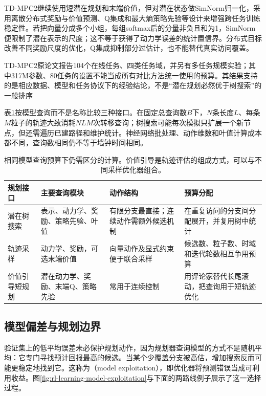 TD-MPC2继续使用短潜在规划和末端价值，但对潜在状态做SimNorm归一化，采用离散分布式奖励与价值预测、Q集成和最大熵策略先验等设计来增强跨任务训练稳定性。若把向量分成多个小组，每组softmax后的分量非负且和为1，SimNorm便限制了潜在表示的尺度；这不等于获得了动力学误差的统计置信界。分布式目标改善不同奖励尺度的优化，Q集成抑制部分过估计，也不能替代真实访问覆盖。

TD-MPC2原论文报告104个在线任务、四类任务域，并另有多任务规模实验；其中317M参数、80任务的设置不能当成所有对比方法统一使用的预算。其结果支持的是相应数据、模型和任务协议下的经验结论，不是“潜在规划必然优于树搜索”的一般排序

表\ref{tab:rl-learning-planning-budgets}按模型查询而不是名称比较三种接口。在固定总查询数$B$下，$N$条长度$L$、每条$M$粒子的轨迹大致消耗$NLM$次转移查询；树搜索可能每次模拟只扩展一个新节点，但还需遍历已建路径和维护统计。神经网络批处理、动作维数和叶值计算成本都不同，查询数相同仍不等于墙钟时间相同。

\begin{table}[t]
  \centering
  \small
  \begin{tabularx}{\linewidth}{>{\raggedright\arraybackslash}p{23mm} >{\raggedright\arraybackslash}X >{\raggedright\arraybackslash}X >{\raggedright\arraybackslash}X}
    \toprule
    规划接口 & 主要查询模块 & 动作结构 & 预算分配 \\
    \midrule
    潜在树搜索 & 表示、动力学、奖励、策略先验、叶值 & 有限分支最直接；连续动作需额外候选机制 & 在重复访问的分支间分配展开，并复用树中统计 \\
    轨迹采样 & 动力学、奖励，可选末端价值 & 向量动作及显式约束便于联合采样 & 候选数、粒子数、时域和迭代轮数相互争用预算 \\
    价值引导短规划 & 潜在动力学、奖励、末端Q、策略先验 & 常用于连续控制 & 用评论家替代长尾滚动，把查询用于短轨迹优化 \\
    \bottomrule
  \end{tabularx}
  \caption{相同模型查询预算下仍需区分的计算。价值引导是轨迹评估的组成方式，可以与不同采样优化器组合。}
  \label{tab:rl-learning-planning-budgets}
\end{table}

\subsection{模型偏差与规划边界}
\label{sec:rl-learning-model-bias}

验证集上的低平均误差未必保护规划动作，因为规划器查询模型的方式不是随机平均：它专门寻找预计回报最高的候选。当某个少覆盖分支被高估，增加搜索反而可能更稳定地找到它。这称为（model exploitation），即优化器将预测错误当成可利用收益。图\ref{fig:rl-learning-model-exploitation}与下面的两路线例子展示了这一选择过程。

